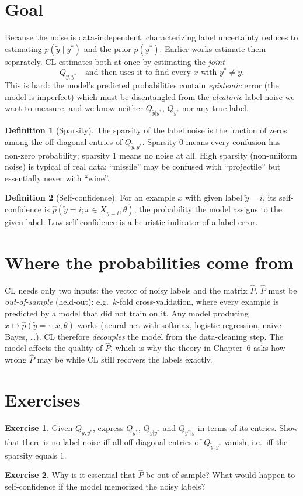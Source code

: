 \documentclass[11pt,a4paper]{report}
\newcommand{\1}{\mathbf 1}
\theoremstyle{definition}
\newtheorem{definition}{Definition}[chapter]
\newtheorem{exercise}{Exercise}[chapter]
\theoremstyle{plain}
\theoremstyle{remark}
\begin{document}
\section{Goal}
Because the noise is data-independent, characterizing label uncertainty reduces to estimating $p(\tilde y\mid y^*)$ and the prior $p(y^*)$. Earlier works estimate them separately. CL estimates both at once by estimating the \emph{joint}
\[
Q_{\tilde y,y^*}\quad\text{and then uses it to find every } x \text{ with } y^*\ne\tilde y .
\]
This is hard: the model's predicted probabilities contain \emph{epistemic} error (the model is imperfect) which must be disentangled from the \emph{aleatoric} label noise we want to measure, and we know neither $Q_{\tilde y|y^*}$, $Q_{y^*}$ nor any true label.

\begin{definition}[Sparsity]
The sparsity of the label noise is the fraction of zeros among the off-diagonal entries of $Q_{\tilde y,y^*}$. Sparsity $0$ means every confusion has non-zero probability; sparsity $1$ means no noise at all. High sparsity (non-uniform noise) is typical of real data: ``missile'' may be confused with ``projectile'' but essentially never with ``wine''.
\end{definition}

\begin{definition}[Self-confidence]
For an example $x$ with given label $\tilde y=i$, its self-confidence is $\hat p(\tilde y=i;x\in X_{\tilde y=i},\theta)$, the probability the model assigns to the given label. Low self-confidence is a heuristic indicator of a label error.
\end{definition}

\section{Where the probabilities come from}
CL needs only two inputs: the vector of noisy labels and the matrix $\hat P$. $\hat P$ must be \emph{out-of-sample} (held-out): e.g.\ $k$-fold cross-validation, where every example is predicted by a model that did not train on it. Any model producing $x\mapsto\hat p(\tilde y=\cdot\,;x,\theta)$ works (neural net with softmax, logistic regression, naive Bayes, \dots). CL therefore \emph{decouples} the model from the data-cleaning step. The model affects the quality of $\hat P$, which is why the theory in Chapter~6 asks how wrong $\hat P$ may be while CL still recovers the labels exactly.

\section*{Exercises}
\begin{exercise}
Given $Q_{\tilde y,y^*}$, express $Q_{y^*}$, $Q_{\tilde y|y^*}$ and $Q_{y^*|\tilde y}$ in terms of its entries. Show that there is no label noise iff all off-diagonal entries of $Q_{\tilde y,y^*}$ vanish, i.e.\ iff the sparsity equals $1$.
\end{exercise}
\begin{exercise}
Why is it essential that $\hat P$ be out-of-sample? What would happen to self-confidence if the model memorized the noisy labels?
\end{exercise}
\end{document}
